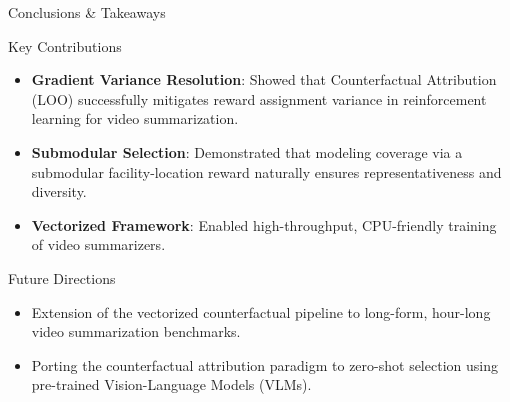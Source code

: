 \documentclass[aspectratio=169]{beamer}
\begin{document}
\begin{frame}{Conclusions \& Takeaways}
    \begin{block}{Key Contributions}
        \begin{itemize}
            \item \textbf{Gradient Variance Resolution}: Showed that Counterfactual Attribution (LOO) successfully mitigates reward assignment variance in reinforcement learning for video summarization.
            \item \textbf{Submodular Selection}: Demonstrated that modeling coverage via a submodular facility-location reward naturally ensures representativeness and diversity.
            \item \textbf{Vectorized Framework}: Enabled high-throughput, CPU-friendly training of video summarizers.
        \end{itemize}
    \end{block}
    
    \begin{block}{Future Directions}
        \begin{itemize}
            \item Extension of the vectorized counterfactual pipeline to long-form, hour-long video summarization benchmarks.
            \item Porting the counterfactual attribution paradigm to zero-shot selection using pre-trained Vision-Language Models (VLMs).
        \end{itemize}
    \end{block}
\end{frame}
\end{document}
